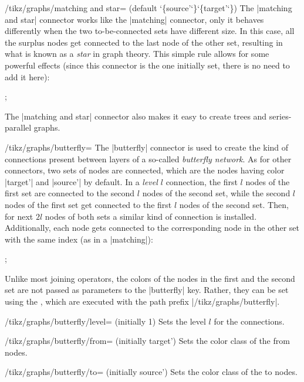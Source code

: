 \begin{key}{/tikz/graphs/matching and star= (default \char`\{source'\char`\}\char`\{target'\char`\})}
    The |matching and star| connector works like the |matching| connector, only
    it behaves differently when the two to-be-connected sets have different
    size. In this case, all the surplus nodes get connected to the last node of
    the other set, resulting in what is known as a \emph{star} in graph theory.
    This simple rule allows for some powerful effects (since this connector is
    the one initially set, there is no need to add it here):
\begin{codeexample}[preamble={\usetikzlibrary{graphs}}]
\tikz {};
\end{codeexample}
    The |matching and star| connector also makes it easy to create trees and
    series-parallel graphs.
\end{key}

\begin{key}{/tikz/graphs/butterfly=}
    The |butterfly| connector is used to create the kind of connections present
    between layers of a so-called \emph{butterfly network}. As for other
    connectors, two sets of nodes are connected, which are the nodes having
    color |target'| and |source'| by default. In a \emph{level $l$} connection,
    the first $l$ nodes of the first set are connected to the second $l$ nodes
    of the second set, while the second $l$ nodes of the first set get
    connected to the first $l$ nodes of the second set. Then, for next $2l$
    nodes of both sets a similar kind of connection is installed. Additionally,
    each node gets connected to the corresponding node in the other set with
    the same index (as in a |matching|):
\begin{codeexample}[preamble={\usetikzlibrary{graphs.standard}}]
\tikz {};
\end{codeexample}
    Unlike most joining operators, the colors of the nodes in the first and the
    second set are not passed as parameters to the |butterfly| key. Rather,
    they can be set using the , which are executed with the path
    prefix |/tikz/graphs/butterfly|.
    \begin{key}{/tikz/graphs/butterfly/level= (initially 1)}
        Sets the level $l$ for the connections.
    \end{key}
    \begin{key}{/tikz/graphs/butterfly/from= (initially target')}
        Sets the color class of the from nodes.
    \end{key}
    \begin{key}{/tikz/graphs/butterfly/to= (initially source')}
        Sets the color class of the to nodes.
    \end{key}
\end{key}


